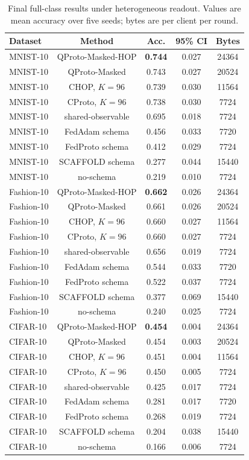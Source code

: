 \documentclass[preprint]{elsarticle}
\newcommand{\method}{QProto}
\begin{document}
\begin{table}[t]
\centering
\caption{Final full-class results under heterogeneous readout. Values are mean accuracy over five seeds; bytes are per client per round.}
\label{tab:masked-fullclass}
\begin{tabular}{lcccc}
\toprule
Dataset & Method & Acc. & 95\% CI & Bytes \\
\midrule
MNIST-10 & \method{}-Masked-HOP & \textbf{0.744} & 0.027 & 24364 \\
MNIST-10 & \method{}-Masked & 0.743 & 0.027 & 20524 \\
MNIST-10 & CHOP, \(K=96\) & 0.739 & 0.030 & 11564 \\
MNIST-10 & CProto, \(K=96\) & 0.738 & 0.030 & 7724 \\
MNIST-10 & shared-observable & 0.695 & 0.018 & 7724 \\
MNIST-10 & FedAdam schema & 0.456 & 0.033 & 7720 \\
MNIST-10 & FedProto schema & 0.412 & 0.029 & 7724 \\
MNIST-10 & SCAFFOLD schema & 0.277 & 0.044 & 15440 \\
MNIST-10 & no-schema & 0.219 & 0.010 & 7724 \\
\midrule
Fashion-10 & \method{}-Masked-HOP & \textbf{0.662} & 0.026 & 24364 \\
Fashion-10 & \method{}-Masked & 0.661 & 0.026 & 20524 \\
Fashion-10 & CHOP, \(K=96\) & 0.660 & 0.027 & 11564 \\
Fashion-10 & CProto, \(K=96\) & 0.660 & 0.027 & 7724 \\
Fashion-10 & shared-observable & 0.656 & 0.019 & 7724 \\
Fashion-10 & FedAdam schema & 0.544 & 0.033 & 7720 \\
Fashion-10 & FedProto schema & 0.522 & 0.037 & 7724 \\
Fashion-10 & SCAFFOLD schema & 0.377 & 0.069 & 15440 \\
Fashion-10 & no-schema & 0.240 & 0.025 & 7724 \\
\midrule
CIFAR-10 & \method{}-Masked-HOP & \textbf{0.454} & 0.004 & 24364 \\
CIFAR-10 & \method{}-Masked & 0.454 & 0.003 & 20524 \\
CIFAR-10 & CHOP, \(K=96\) & 0.451 & 0.004 & 11564 \\
CIFAR-10 & CProto, \(K=96\) & 0.450 & 0.005 & 7724 \\
CIFAR-10 & shared-observable & 0.425 & 0.017 & 7724 \\
CIFAR-10 & FedAdam schema & 0.281 & 0.017 & 7720 \\
CIFAR-10 & FedProto schema & 0.268 & 0.019 & 7724 \\
CIFAR-10 & SCAFFOLD schema & 0.204 & 0.038 & 15440 \\
CIFAR-10 & no-schema & 0.166 & 0.006 & 7724 \\
\bottomrule
\end{tabular}
\end{table}
\end{document}
